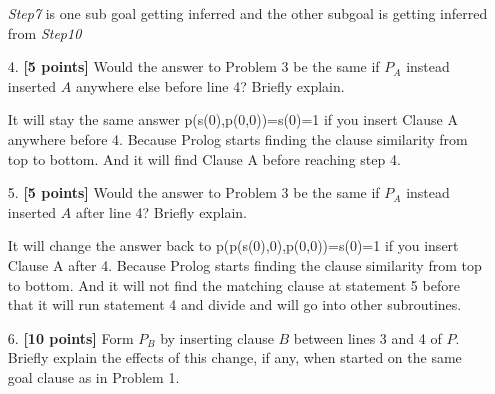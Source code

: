 \documentclass{article}
\begin{document}
\begin{enumerate}
\begin{answer}
    \textit{Step7} is one sub goal getting inferred and the other subgoal is getting inferred from \textit{Step10}
\end{answer}
\item[4.] \textbf{[5 points]} Would the answer to Problem 3 be the
  same if $P_A$ instead inserted $A$ anywhere else before line 4?
  Briefly explain.
\begin{answer}
It will stay the same answer p(s(0),p(0,0))=s(0)=1 if you insert Clause A anywhere before 4. Because Prolog starts finding the clause similarity from top to bottom. And it will find Clause A before reaching step 4.
\end{answer}
\item[5.] \textbf{[5 points]} Would the answer to Problem 3 be the
  same if $P_A$ instead inserted $A$ after line 4?
  Briefly explain.
\begin{answer}
It will change the answer back to p(p(s(0),0),p(0,0))=s(0)=1 if you insert Clause A after 4. Because Prolog starts finding the clause similarity from top to bottom. And it will not find the matching clause at statement 5 before that it will run statement 4 and divide and will go into other subroutines.
\end{answer}
\item[6.] \textbf{[10 points]} Form $P_B$ by inserting clause $B$
  between lines 3 and 4 of $P$.  Briefly explain the effects of this
  change, if any, when started on the same goal clause as in Problem
  1.
\end{enumerate}
\end{document}
